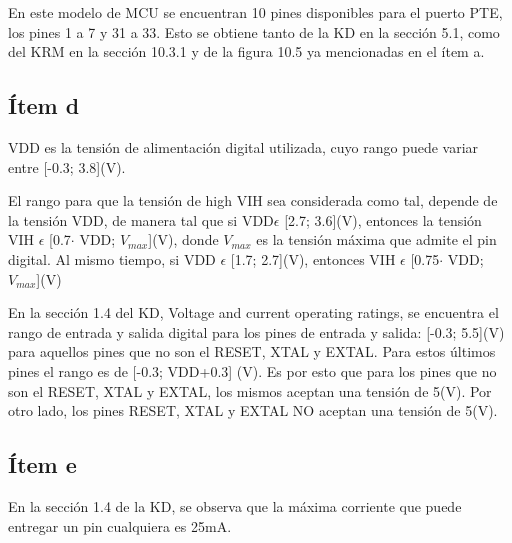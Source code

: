 \documentclass[micros_g1_main.tex]{subfiles}
\begin{document}
En este modelo de MCU se encuentran 10 pines disponibles para el puerto PTE, los pines 1 a 7 y 31 a 33. Esto se obtiene tanto de la KD en la sección 5.1, como del KRM en la sección 10.3.1 y de la figura 10.5 ya mencionadas en el ítem a.

\subsection{Ítem d}
VDD es la tensión de alimentación digital utilizada, cuyo rango puede variar entre [-0.3; 3.8](V).\par
El rango para que la tensión de high VIH sea considerada como tal, depende de la tensión VDD, de manera tal que si VDD$\epsilon$ [2.7; 3.6](V), entonces la tensión VIH $\epsilon$ [0.7$\cdot$ VDD; $V_{max}$](V), donde $V_{max}$ es la tensión máxima que admite el pin digital. Al mismo tiempo, si VDD $\epsilon$ [1.7; 2.7](V), entonces VIH $\epsilon$ [0.75$\cdot$ VDD; $V_{max}$](V)\par
En la sección 1.4 del KD, Voltage and current operating ratings, se encuentra el rango de entrada y salida digital para los pines de entrada y salida: [-0.3; 5.5](V) para aquellos pines que no son el RESET, XTAL y EXTAL. Para estos últimos pines el rango es de [-0.3; VDD+0.3] (V). Es por esto que para los pines que no son el RESET, XTAL y EXTAL, los mismos aceptan una tensión de 5(V). Por otro lado, los pines RESET, XTAL y EXTAL NO aceptan una tensión de 5(V).\par

\subsection{Ítem e}
En la sección 1.4 de la KD, se observa que la máxima corriente que puede entregar un pin cualquiera es 25mA.
\end{document}
